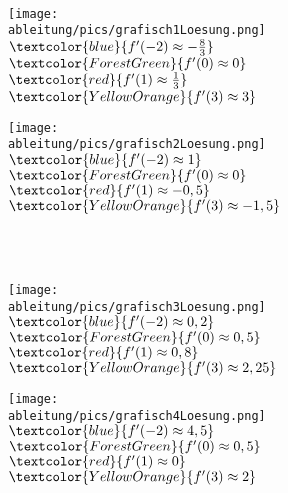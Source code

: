\begin{Answer}[ref=grafischABlA1]\\
	\begin{minipage}{\textwidth}
		\begin{minipage}{0.49\textwidth}
			\centering\texttt{[image: \\ableitung/pics/grafisch1Loesung.png]}\\
			\(\textcolor{blue}{f'(-2)\approx-\frac{8}{3}}\)\\
			\(\textcolor{ForestGreen}{f'(0)\approx0}\)\\
			\(\textcolor{red}{f'(1)\approx\frac{1}{3}}\)\\
			\(\textcolor{YellowOrange}{f'(3)\approx 3}\)\\
		\end{minipage}
		\begin{minipage}{0.49\textwidth}
			\centering\texttt{[image: \\ableitung/pics/grafisch2Loesung.png]}\\
			\(\textcolor{blue}{f'(-2)\approx1}\)\\
			\(\textcolor{ForestGreen}{f'(0)\approx0}\)\\
			\(\textcolor{red}{f'(1)\approx-0,5}\)\\
			\(\textcolor{YellowOrange}{f'(3)\approx-1,5}\)\\
		\end{minipage}
	\end{minipage}\\\phantom{x}\\
	\begin{minipage}{\textwidth}
		\begin{minipage}{0.49\textwidth}
			\centering\texttt{[image: \\ableitung/pics/grafisch3Loesung.png]}\\
			\(\textcolor{blue}{f'(-2)\approx0,2}\)\\
			\(\textcolor{ForestGreen}{f'(0)\approx0,5}\)\\
			\(\textcolor{red}{f'(1)\approx0,8}\)\\
			\(\textcolor{YellowOrange}{f'(3)\approx2,25}\)\\
		\end{minipage}
		\begin{minipage}{0.49\textwidth}
			\centering\texttt{[image: \\ableitung/pics/grafisch4Loesung.png]}\\
			\(\textcolor{blue}{f'(-2)\approx4,5}\)\\
			\(\textcolor{ForestGreen}{f'(0)\approx0,5}\)\\
			\(\textcolor{red}{f'(1)\approx0}\)\\
			\(\textcolor{YellowOrange}{f'(3)\approx2}\)\\
		\end{minipage}\\
	\end{minipage}
\end{Answer}